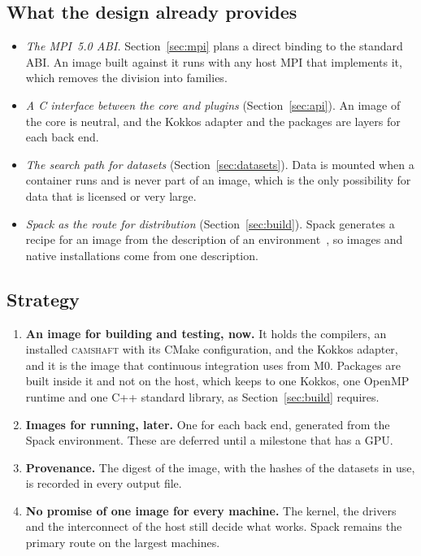 \documentclass[11pt,a4paper]{article}
\newcommand{\camshaft}{\textsc{camshaft}}
\begin{document}
\subsection{What the design already provides}

\begin{itemize}
  \item \emph{The MPI~5.0 ABI.}  Section~\ref{sec:mpi} plans a direct
        binding to the standard ABI.  An image built against it runs with
        any host MPI that implements it, which removes the division into
        families.
  \item \emph{A C interface between the core and plugins}
        (Section~\ref{sec:api}).  An image of the core is neutral, and the
        Kokkos adapter and the packages are layers for each back end.
  \item \emph{The search path for datasets} (Section~\ref{sec:datasets}).
        Data is mounted when a container runs and is never part of an
        image, which is the only possibility for data that is licensed or
        very large.
  \item \emph{Spack as the route for distribution}
        (Section~\ref{sec:build}).  Spack generates a recipe for an image
        from the description of an environment~\cite{spackcontainers}, so
        images and native installations come from one description.
\end{itemize}

\subsection{Strategy}

\begin{enumerate}
  \item \textbf{An image for building and testing, now.}  It holds the
        compilers, an installed \camshaft{} with its CMake configuration,
        and the Kokkos adapter, and it is the image that continuous
        integration uses from M0.  Packages are built inside it and not on
        the host, which keeps to one Kokkos, one OpenMP runtime and one C++
        standard library, as Section~\ref{sec:build} requires.
  \item \textbf{Images for running, later.}  One for each back end,
        generated from the Spack environment.  These are deferred until a
        milestone that has a GPU.
  \item \textbf{Provenance.}  The digest of the image, with the hashes of
        the datasets in use, is recorded in every output file.
  \item \textbf{No promise of one image for every machine.}  The kernel, the
        drivers and the interconnect of the host still decide what works.
        Spack remains the primary route on the largest machines.
\end{enumerate}
\end{document}
